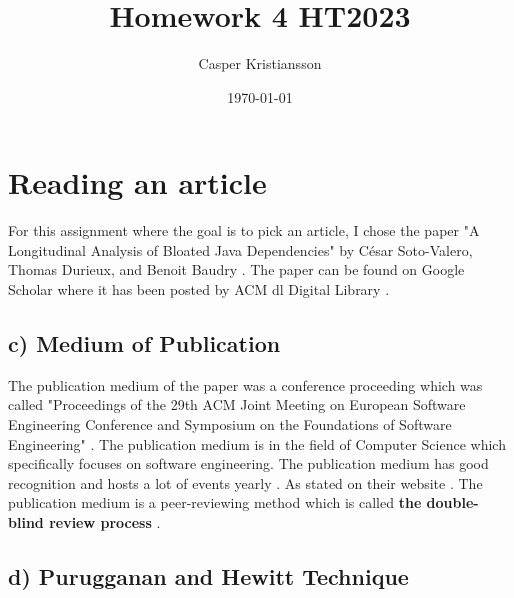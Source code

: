 \documentclass{article}
\title{Homework 4 HT2023}
\author{Casper Kristiansson}
\date{\today}
\begin{document}
\maketitle

\section*{Reading an article}
For this assignment where the goal is to pick an article, I chose the paper "A Longitudinal Analysis of Bloated Java Dependencies" by César Soto-Valero,  Thomas Durieux, and Benoit Baudry \cite{soltechhw4}. The paper can be found on Google Scholar where it has been posted by ACM dl Digital Library \cite{ACM2023}.


\subsection*{c) Medium of Publication}

The publication medium of the paper was a conference proceeding which was called "Proceedings of the 29th ACM Joint Meeting on European Software Engineering Conference and Symposium on the Foundations of Software Engineering" \cite{soltechhw4}. The publication medium is in the field of Computer Science which specifically focuses on software engineering. The publication medium has good recognition and hosts a lot of events yearly \cite{ESEC-FSE2023}. As stated on their website . The publication medium is a peer-reviewing method which is called \textbf{the double-blind review process} \cite{ESEC-FSE2022}.

\subsection*{d) Purugganan and Hewitt Technique}
\end{document}
